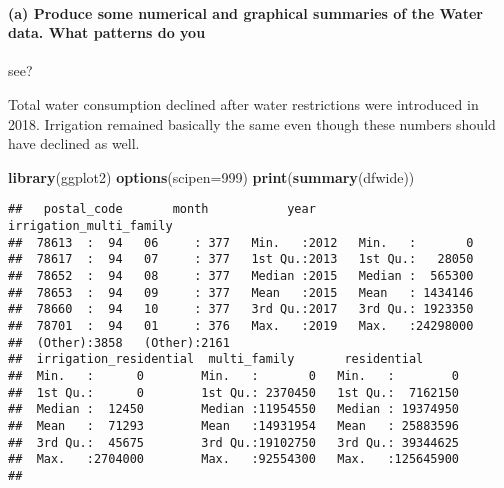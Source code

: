 \documentclass[]{article}
\newenvironment{Shaded}{\begin{snugshade}}{\end{snugshade}}
\newcommand{\DataTypeTok}[1]{\textcolor[rgb]{0.13,0.29,0.53}{#1}}
\newcommand{\DecValTok}[1]{\textcolor[rgb]{0.00,0.00,0.81}{#1}}
\newcommand{\KeywordTok}[1]{\textcolor[rgb]{0.13,0.29,0.53}{\textbf{#1}}}
\newcommand{\NormalTok}[1]{#1}
\let\oldparagraph\paragraph
\renewcommand{\paragraph}[1]{\oldparagraph{#1}\mbox{}}
\begin{document}
\hypertarget{a-produce-some-numerical-and-graphical-summaries-of-the-water-data.-what-patterns-do-you}{%
\paragraph{(a) Produce some numerical and graphical summaries of the
Water data. What patterns do
you}\label{a-produce-some-numerical-and-graphical-summaries-of-the-water-data.-what-patterns-do-you}}

see?

Total water consumption declined after water restrictions were
introduced in 2018. Irrigation remained basically the same even though
these numbers should have declined as well.

\begin{Shaded}
\begin{Highlighting}[]
\KeywordTok{library}\NormalTok{(ggplot2)}
\KeywordTok{options}\NormalTok{(}\DataTypeTok{scipen=}\DecValTok{999}\NormalTok{)}
\KeywordTok{print}\NormalTok{(}\KeywordTok{summary}\NormalTok{(dfwide))}
\end{Highlighting}
\end{Shaded}

\begin{verbatim}
##   postal_code       month           year      irrigation_multi_family
##  78613  :  94   06     : 377   Min.   :2012   Min.   :       0       
##  78617  :  94   07     : 377   1st Qu.:2013   1st Qu.:   28050       
##  78652  :  94   08     : 377   Median :2015   Median :  565300       
##  78653  :  94   09     : 377   Mean   :2015   Mean   : 1434146       
##  78660  :  94   10     : 377   3rd Qu.:2017   3rd Qu.: 1923350       
##  78701  :  94   01     : 376   Max.   :2019   Max.   :24298000       
##  (Other):3858   (Other):2161                                         
##  irrigation_residential  multi_family       residential       
##  Min.   :      0        Min.   :       0   Min.   :        0  
##  1st Qu.:      0        1st Qu.: 2370450   1st Qu.:  7162150  
##  Median :  12450        Median :11954550   Median : 19374950  
##  Mean   :  71293        Mean   :14931954   Mean   : 25883596  
##  3rd Qu.:  45675        3rd Qu.:19102750   3rd Qu.: 39344625  
##  Max.   :2704000        Max.   :92554300   Max.   :125645900  
## 
\end{verbatim}
\end{document}
